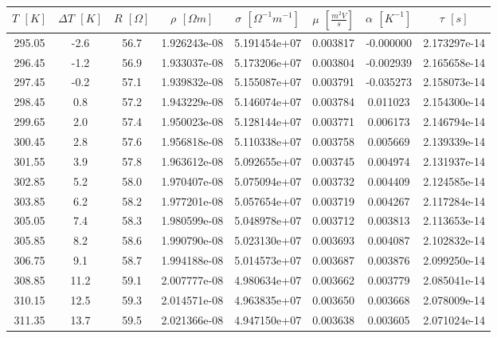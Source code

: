 \documentclass[a4paper,11pt]{article}
\begin{document}
    \begin{table}[b]
        \centering
        \begin{tabular}{|c|c|c|c|c|c|c|c|}
            \hline
            $T$ $\left[K\right]$ & $\Delta T$ $\left[K\right]$ & $R$ $\left[\Omega \right]$ & $\rho$ $\left[\Omega m \right]$ & $\sigma$ $\left[\Omega^{-1} m^{-1} \right]$ & $\mu$ $\left[\frac{m^2 V}{s} \right]$ & $\alpha$ $[K^{-1}]$ & $\tau$ $[s]$\\
            \hline
            295.05 & -2.6 & 56.7 & 1.926243e-08 & 5.191454e+07 & 0.003817 & -0.000000 & 2.173297e-14\\
            296.45 & -1.2 & 56.9   & 1.933037e-08 & 5.173206e+07 & 0.003804 & -0.002939 &2.165658e-14  \\
            297.45 & -0.2 & 57.1   & 1.939832e-08 & 5.155087e+07 & 0.003791 & -0.035273 &2.158073e-14\\
            298.45 & 0.8 & 57.2  & 1.943229e-08 & 5.146074e+07 &  0.003784 & 0.011023 & 2.154300e-14  \\
            299.65 & 2.0 & 57.4   & 1.950023e-08 & 5.128144e+07  & 0.003771 & 0.006173   &2.146794e-14\\
            300.45 & 2.8 & 57.6   & 1.956818e-08 & 5.110338e+07 & 0.003758 & 0.005669   & 2.139339e-14\\
            301.55 & 3.9 & 57.8   & 1.963612e-08 & 5.092655e+07 &  0.003745 & 0.004974    &  2.131937e-14\\
            302.85 & 5.2 & 58.0   & 1.970407e-08 & 5.075094e+07 & 0.003732 & 0.004409 & 2.124585e-14\\
            303.85 & 6.2   & 58.2   & 1.977201e-08 & 5.057654e+07  &  0.003719 & 0.004267   &2.117284e-14\\
            305.05 & 7.4   & 58.3   & 1.980599e-08 &  5.048978e+07  & 0.003712 & 0.003813 & 2.113653e-14\\
            305.85 & 8.2   & 58.6   & 1.990790e-08 & 5.023130e+07 & 0.003693 & 0.004087   & 2.102832e-14\\
            306.75 & 9.1   & 58.7   & 1.994188e-08 & 5.014573e+07 & 0.003687  & 0.003876  &  2.099250e-14 \\
            308.85 & 11.2   & 59.1   & 2.007777e-08 & 4.980634e+07 & 0.003662 & 0.003779 &   2.085041e-14  \\
            310.15 & 12.5   & 59.3   & 2.014571e-08 & 4.963835e+07 & 0.003650 & 0.003668 &  2.078009e-14  \\
            311.35 & 13.7   & 59.5   & 2.021366e-08 & 4.947150e+07 & 0.003638  & 0.003605   &  2.071024e-14 \\

\end{tabular}
\end{table}
\end{document}
